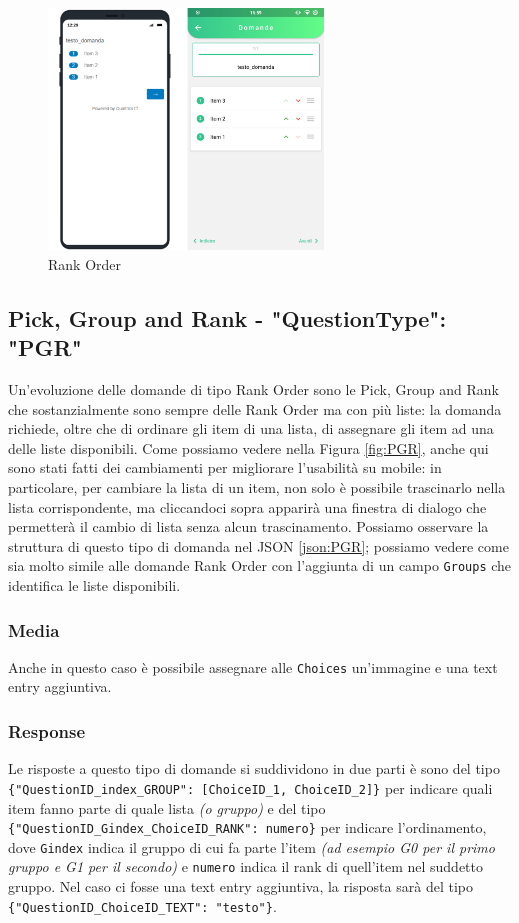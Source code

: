 \begin{figure}[h!]
\centering
\includegraphics[width=0.65\textwidth]{img/rank_order}
\caption{Rank Order}
\label{fig:rank_order}
\end{figure}

\clearpage
\subsection{Pick, Group and Rank - "QuestionType": "PGR"}
Un'evoluzione delle domande di tipo Rank Order sono le Pick, Group and Rank che sostanzialmente sono sempre delle Rank Order ma con più liste: la domanda richiede, oltre che di ordinare gli item di una lista, di assegnare gli item ad una delle liste disponibili. Come possiamo vedere nella Figura \ref{fig:PGR}, anche qui sono stati fatti dei cambiamenti per migliorare l'usabilità su mobile: in particolare, per cambiare la lista di un item, non solo è possibile trascinarlo nella lista corrispondente, ma cliccandoci sopra apparirà una finestra di dialogo che permetterà il cambio di lista senza alcun trascinamento. Possiamo osservare la struttura di questo tipo di domanda nel JSON \ref{json:PGR}; possiamo vedere come sia molto simile alle domande Rank Order con l'aggiunta di un campo \texttt{Groups} che identifica le liste disponibili.

\subsubsection{Media}
Anche in questo caso è possibile assegnare alle \texttt{Choices} un'immagine e una text entry aggiuntiva.

\subsubsection{Response}
Le risposte a questo tipo di domande si suddividono in due parti è sono del tipo \texttt{\{"QuestionID\_index\_GROUP": [ChoiceID\_1, ChoiceID\_2]\}} per indicare quali item fanno parte di quale lista \textit{(o gruppo)} e del tipo\\ \texttt{\{"QuestionID\_Gindex\_ChoiceID\_RANK": numero\}} per indicare l'ordinamento, dove \texttt{Gindex} indica il gruppo di cui fa parte l'item \textit{(ad esempio G0 per il primo gruppo e G1 per il secondo)} e \texttt{numero} indica il rank di quell'item nel suddetto gruppo.
Nel caso ci fosse una text entry aggiuntiva, la risposta sarà del tipo \texttt{\{"QuestionID\_ChoiceID\_TEXT": "testo"\}}.

